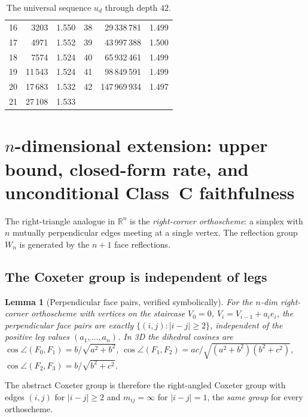 \documentclass[11pt,a4paper]{article}
\newtheorem{lemma}[theorem]{Lemma}
\theoremstyle{remark}
\theoremstyle{plain}
\begin{document}
\begin{table}[ht!]
\begin{tabular}{r r c r r c}
16 & 3203               & 1.550 & 38 & 29\,338\,781    & 1.499 \\
17 & 4971               & 1.552 & 39 & 43\,997\,388    & 1.500 \\
18 & 7574               & 1.524 & 40 & 65\,932\,461    & 1.499 \\
19 & 11\,543            & 1.524 & 41 & 98\,849\,591    & 1.499 \\
20 & 17\,683            & 1.532 & 42 & 147\,969\,934   & 1.497 \\
21 & 27\,108            & 1.533 &    &                  &       \\
\bottomrule
\end{tabular}
\caption{The universal sequence $u_d$ through depth $42$.}
\label{tab:tail}
\end{table}

\section{$n$-dimensional extension: upper bound, closed-form rate, and unconditional Class~C faithfulness}
\label{sec:ortho}

The right-triangle analogue in $\mathbb{R}^n$ is the \emph{right-corner
orthoscheme}: a simplex with $n$ mutually perpendicular edges meeting
at a single vertex.  The reflection group $W_n$ is generated by the
$n+1$ face reflections.

\subsection{The Coxeter group is independent of legs}

\begin{lemma}[Perpendicular face pairs, verified symbolically]
\label{lem:perp-pairs}
For the $n$-dim right-corner orthoscheme with vertices on the staircase
$V_0 = 0$, $V_i = V_{i-1} + a_i e_i$, the perpendicular face pairs are
exactly $\{(i, j) : |i - j| \ge 2\}$, independent of the positive leg
values $(a_1, \ldots, a_n)$.  In 3D the dihedral cosines are
$\cos\angle(F_0, F_1) = b/\sqrt{a^2 + b^2}$,
$\cos\angle(F_1, F_2) = ac/\sqrt{(a^2+b^2)(b^2+c^2)}$,
$\cos\angle(F_2, F_3) = b/\sqrt{b^2+c^2}$.
\end{lemma}

The abstract Coxeter group is therefore the right-angled Coxeter group
with edges $(i, j)$ for $|i - j| \ge 2$ and $m_{ij} = \infty$ for
$|i - j| = 1$, the \emph{same group} for every orthoscheme.
\end{document}

